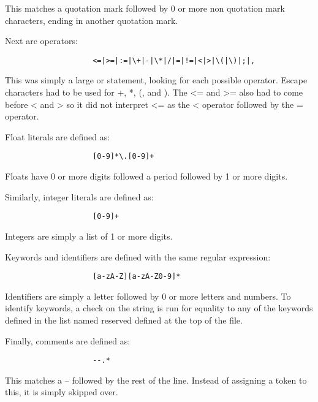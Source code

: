\documentclass[12pt]{article}
\begin{document}
                This matches a quotation mark followed by 0 or more non quotation mark characters, ending in another quotation mark.

                Next are operators:

                \begin{verbatim}
                    <=|>=|:=|\+|-|\*|/|=|!=|<|>|\(|\)|;|,
                \end{verbatim}

                This was simply a large or statement, looking for each possible operator. Escape characters had to be used for +, *, (, and ). The <= and >= also had to come before < and > so it did not interpret <= as the < operator followed by the = operator.

                Float literals are defined as:

                \begin{verbatim}
                    [0-9]*\.[0-9]+
                \end{verbatim}

                Floats have 0 or more digits followed a period followed by 1 or more digits.

                Similarly, integer literals are defined as: 

                \begin{verbatim}
                    [0-9]+
                \end{verbatim}

                Integers are simply a list of 1 or more digits.

                Keywords and identifiers are defined with the same regular expression:

                \begin{verbatim}
                    [a-zA-Z][a-zA-Z0-9]*
                \end{verbatim}

                Identifiers are simply a letter followed by 0 or more letters and numbers. To identify keywords, a check on the string is run for equality to any of the keywords defined in the list named reserved defined at the top of the file.

                Finally, comments are defined as:

                \begin{verbatim}
                    --.*
                \end{verbatim}

                This matches a -- followed by the rest of the line. Instead of assigning a token to this, it is simply skipped over.
\end{document}
